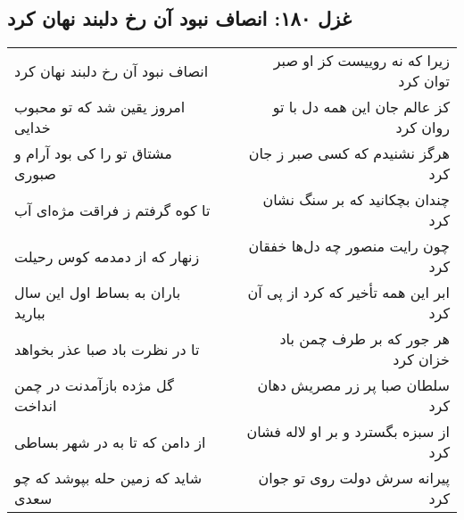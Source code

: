\begin{center}
\section*{غزل ۱۸۰: انصاف نبود آن رخ دلبند نهان کرد}
\label{sec:180}
\begin{longtable}{l p{0.5cm} r}
انصاف نبود آن رخ دلبند نهان کرد
&&
زیرا که نه روییست کز او صبر توان کرد
\\
امروز یقین شد که تو محبوب خدایی
&&
کز عالم جان این همه دل با تو روان کرد
\\
مشتاق تو را کی بود آرام و صبوری
&&
هرگز نشنیدم که کسی صبر ز جان کرد
\\
تا کوه گرفتم ز فراقت مژه‌ای آب
&&
چندان بچکانید که بر سنگ نشان کرد
\\
زنهار که از دمدمه کوس رحیلت
&&
چون رایت منصور چه دل‌ها خفقان کرد
\\
باران به بساط اول این سال ببارید
&&
ابر این همه تأخیر که کرد از پی آن کرد
\\
تا در نظرت باد صبا عذر بخواهد
&&
هر جور که بر طرف چمن باد خزان کرد
\\
گل مژده بازآمدنت در چمن انداخت
&&
سلطان صبا پر زر مصریش دهان کرد
\\
از دامن که تا به در شهر بساطی
&&
از سبزه بگسترد و بر او لاله فشان کرد
\\
شاید که زمین حله بپوشد که چو سعدی
&&
پیرانه سرش دولت روی تو جوان کرد
\\
\end{longtable}
\end{center}
